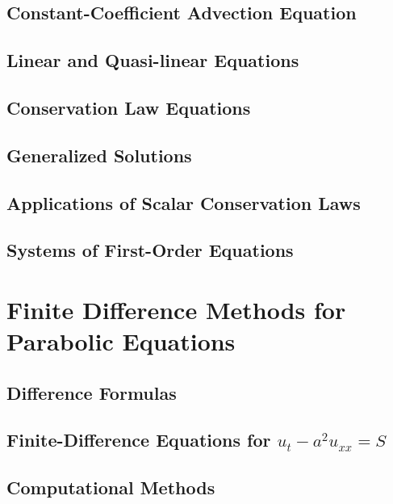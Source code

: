 \documentclass{amsbook}%
\theoremstyle{plain}
\numberwithin{equation}{section}
\begin{document}
	\section{Constant-Coefficient Advection Equation}
	
	\section{Linear and Quasi-linear Equations}
	
	\section{Conservation Law Equations}
	
	\section{Generalized Solutions}
	
	\section{Applications of Scalar Conservation Laws}
	
	\section{Systems of First-Order Equations}

\chapter{Finite Difference Methods for Parabolic Equations}

	\section{Difference Formulas}
	
	\section{Finite-Difference Equations for $u_t-a^2u_{xx}=S$}

	\section{Computational Methods}
	
\end{document}
